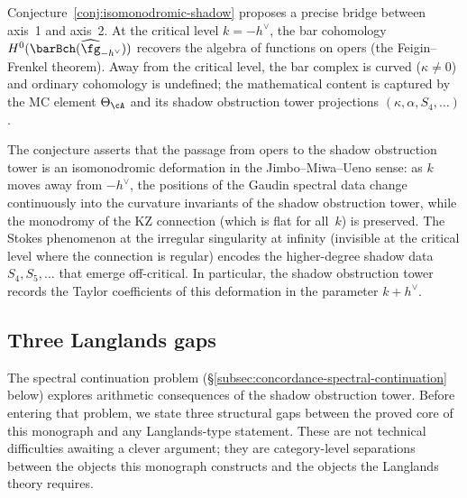\begin{remark}%
\label{rem:oper-shadow-bridge}%
Conjecture~\ref{conj:isomonodromic-shadow} proposes a
precise bridge between axis~1 and axis~2. At the critical
level $k = -h^\vee$, the bar cohomology
$H^0(\barBch(\widehat{\fg}_{-h^\vee}))$ recovers the algebra
of functions on opers (the Feigin--Frenkel theorem). Away
from the critical level, the bar complex is curved
($\kappa \neq 0$) and ordinary cohomology is undefined; the
mathematical content is captured by the MC element
$\Theta_\cA$ and its shadow obstruction tower projections
$(\kappa, \alpha, S_4, \ldots)$.

The conjecture asserts that the passage from opers to the
shadow obstruction tower is an isomonodromic deformation in the
Jimbo--Miwa--Ueno sense: as $k$ moves away from $-h^\vee$,
the positions of the Gaudin spectral data change continuously
into the curvature invariants of the shadow obstruction tower, while the
monodromy of the KZ connection (which is flat for all~$k$)
is preserved. The Stokes phenomenon at the irregular
singularity at infinity (invisible at the critical level
where the connection is regular) encodes the higher-degree
shadow data $S_4, S_5, \ldots$ that emerge off-critical.
In particular, the shadow obstruction tower records the Taylor
coefficients of this deformation in the parameter
$k + h^\vee$.
\end{remark}

\subsection{Three Langlands gaps}
\label{subsec:concordance-langlands-gaps}

The spectral continuation problem
(\S\ref{subsec:concordance-spectral-continuation} below)
explores arithmetic consequences of the shadow obstruction tower.
Before entering that problem, we state three structural
gaps between the proved core of this monograph and any
Langlands-type statement. These are not technical
difficulties awaiting a clever argument; they are
category-level separations between the objects this
monograph constructs and the objects the Langlands
theory requires.

